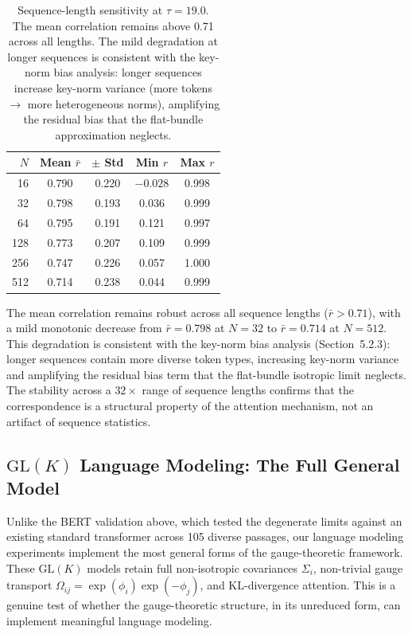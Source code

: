 \documentclass[twoside,11pt]{article}
\begin{document}
\begin{table}[h]
\centering
\renewcommand{\arraystretch}{1.15}
\begin{tabular}{rcccc}
\hline
$N$ & Mean $\bar{r}$ & $\pm$ Std & Min $r$ & Max $r$ \\
\hline
16  & 0.790 & 0.220 & $-0.028$ & 0.998 \\
32  & 0.798 & 0.193 & 0.036    & 0.999 \\
64  & 0.795 & 0.191 & 0.121    & 0.997 \\
128 & 0.773 & 0.207 & 0.109    & 0.999 \\
256 & 0.747 & 0.226 & 0.057    & 1.000 \\
512 & 0.714 & 0.238 & 0.044    & 0.999 \\
\hline
\end{tabular}
\caption{Sequence-length sensitivity at $\tau = 19.0$. The mean correlation remains above 0.71 across all lengths. The mild degradation at longer sequences is consistent with the key-norm bias analysis: longer sequences increase key-norm variance (more tokens $\to$ more heterogeneous norms), amplifying the residual bias that the flat-bundle approximation neglects.}
\label{tab:seqlen}
\end{table}

The mean correlation remains robust across all sequence lengths ($\bar{r} > 0.71$), with a mild monotonic decrease from $\bar{r} = 0.798$ at $N = 32$ to $\bar{r} = 0.714$ at $N = 512$. This degradation is consistent with the key-norm bias analysis (Section~5.2.3): longer sequences contain more diverse token types, increasing key-norm variance and amplifying the residual bias term that the flat-bundle isotropic limit neglects. The stability across a $32\times$ range of sequence lengths confirms that the correspondence is a structural property of the attention mechanism, not an artifact of sequence statistics.

\subsection{$\mathrm{GL}(K)$ Language Modeling: The Full General Model}
\label{sec:glk_lm}

Unlike the BERT validation above, which tested the degenerate limits against an existing standard transformer across 105 diverse passages, our language modeling experiments implement the most general forms of the gauge-theoretic framework. These $\mathrm{GL}(K)$ models retain full non-isotropic covariances $\Sigma_i$, non-trivial gauge transport $\Omega_{ij} = \exp(\phi_i)\exp(-\phi_j)$, and KL-divergence attention. This is a genuine test of whether the gauge-theoretic structure, in its unreduced form, can implement meaningful language modeling.
\end{document}
